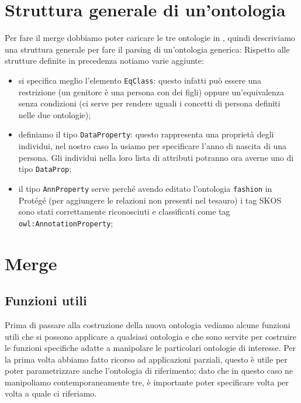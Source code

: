 \section{Struttura generale di un'ontologia}
Per fare il merge dobbiamo poter caricare le tre ontologie in \cduce, quindi descriviamo una struttura generale per fare il parsing di un'ontologia generica:
Rispetto alle strutture definite in precedenza notiamo varie aggiunte:
\begin{itemize}
	\item si specifica meglio l'elemento \verb|EqClass|: questo infatti può essere una restrizione (un genitore è una persona con dei figli) oppure un'equivalenza senza condizioni (ci serve per rendere uguali i concetti di persona definiti nelle due ontologie);
	\item definiamo il tipo \verb|DataProperty|: questo rappresenta una proprietà degli individui, nel nostro caso la usiamo per specificare l'anno di nascita di una persona. Gli individui nella loro lista di attributi potranno ora averne uno di tipo \verb|DataProp|;
	\item il tipo \verb|AnnProperty| serve perché avendo editato l'ontologia \verb|fashion| in Protégé (per aggiungere le relazioni non presenti nel tesauro) i tag SKOS sono stati correttamente riconosciuti \cite{OWL&SKOS} e classificati come tag \verb|owl:AnnotationProperty|;
\end{itemize}
\section{Merge}
\subsection{Funzioni utili}
Prima di passare alla costruzione della nuova ontologia vediamo alcune funzioni utili che si possono applicare a qualsiasi ontologia e che sono servite per costruire le funzioni specifiche adatte a manipolare le particolari ontologie di interesse.
Per la prima volta abbiamo fatto ricorso ad applicazioni parziali, questo è utile per poter parametrizzare anche l'ontologia di riferimento; dato che in questo caso ne manipoliamo contemporaneamente tre, è importante poter specificare volta per volta a quale ci riferiamo.

